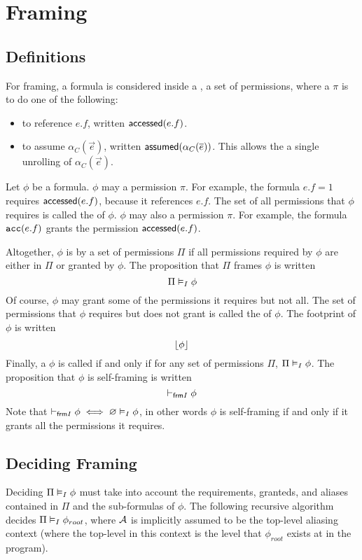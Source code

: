 \section{Framing}

\subsection{Definitions}

For framing, a formula is considered inside a , a set of permissions, where a  $\pi$ is to do one of the following:
\begin{itemize}
  \item to reference $e.f$, written $\textsf{accessed}(e.f)$.
  \item to assume $\alpha_C(\vec{e})$, written $\textsf{assumed}(\alpha_C(\overline{e}))$. This allows the a single unrolling of $\alpha_C(\vec{e})$.
\end{itemize}
%
Let $\phi$ be a formula.
$\phi$ may  a permission $\pi$. For example, the formula $e.f = 1$ requires $\textsf{accessed}(e.f)$, because it references $e.f$. The set of all permissions that $\phi$ requires is called the  of $\phi$. $\phi$ may also  a permission $\pi$. For example, the formula $\texttt{acc}(e.f)$ grants the permission $\textsf{accessed}(e.f)$.

Altogether, $\phi$ is  by a set of permissions $\Pi$ if all permissions required by $\phi$ are either in $\Pi$ or granted by $\phi$. The proposition that $\Pi$ frames $\phi$ is written
$$
  \Pi \vDash_I \phi
$$
Of course, $\phi$ may grant some of the permissions it requires but not all. The set of permissions that $\phi$ requires but does not grant is called the  of $\phi$. The footprint of $\phi$ is written
$$
  \lfloor \phi \rfloor
$$
Finally, a $\phi$ is called  if and only if for any set of permissions $\Pi$, $\Pi \vDash_I \phi$. The proposition that $\phi$ is self-framing is written
$$
  \vdash_{\textsf{frm}I} \phi
$$
Note that $\vdash_{\textsf{frm}I} \phi \iff \varnothing \vDash_I \phi$, in other words $\phi$ is self-framing if and only if it grants all the permissions it requires.

\subsection{Deciding Framing}

Deciding $\Pi \vDash_I \phi$ must take into account the requirements, granteds, and aliases contained in $\Pi$ and the sub-formulas of $\phi$.
The following recursive algorithm decides $\Pi \vDash_I \phi_{root}$, where $\mathcal{A}$ is implicitly assumed to be the top-level aliasing context (where the top-level in this context is the level that $\phi_{root}$ exists at in the program).

